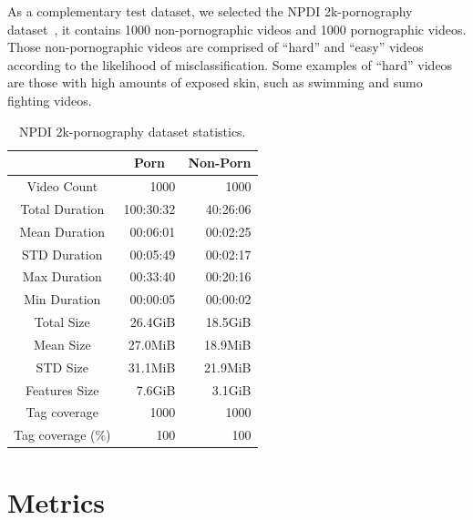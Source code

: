As a complementary test dataset, we selected the NPDI 2k-pornography dataset~\cite{avila2013pooling}, it contains 1000 non-pornographic videos and 1000 pornographic videos. Those non-pornographic videos are comprised of ``hard'' and ``easy'' videos according to the likelihood of misclassification. Some examples of ``hard'' videos are those with high amounts of exposed skin, such as swimming and sumo fighting videos.

\begin{table}
\centering
\label{tab:2kdataset-stats}
\caption{NPDI 2k-pornography dataset statistics.}
\begin{tabular}{c|r|r} 
\multicolumn{1}{l|}{} & \multicolumn{1}{c|}{Porn} & \multicolumn{1}{c}{Non-Porn}  \\ 
\hline
Video Count           & 1000                      & 1000                           \\ 
\hline
Total Duration        & 100:30:32                 & 40:26:06                       \\ 
\hline
Mean Duration         & 00:06:01                  & 00:02:25                       \\ 
\hline
STD Duration          & 00:05:49                  & 00:02:17                       \\ 
\hline
Max Duration          & 00:33:40                  & 00:20:16                       \\ 
\hline
Min Duration          & 00:00:05                  & 00:00:02                       \\ 
\hline
Total Size            & 26.4GiB                   & 18.5GiB                        \\ 
\hline
Mean Size             & 27.0MiB                   & 18.9MiB                        \\ 
\hline
STD Size              & 31.1MiB                   & 21.9MiB                        \\ 
\hline
Features Size         & 7.6GiB                    & 3.1GiB                         \\ 
\hline
Tag coverage          & 1000                      & 1000                           \\ 
\hline
Tag coverage (\%)     & 100                       & 100                            \\
\end{tabular}
\end{table}

\section{Metrics}\label{sec:metrics}

